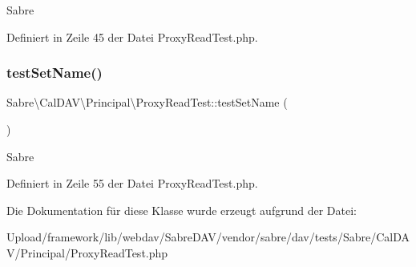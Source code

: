 Sabre 

Definiert in Zeile 45 der Datei Proxy\+Read\+Test.\+php.

\mbox{\label{class_sabre_1_1_cal_d_a_v_1_1_principal_1_1_proxy_read_test_aaf3eb3b9007216ae427118c91dc80aac}} 
\subsubsection{\texorpdfstring{test\+Set\+Name()}{testSetName()}}
{\footnotesize\ttfamily Sabre\textbackslash{}\+Cal\+D\+A\+V\textbackslash{}\+Principal\textbackslash{}\+Proxy\+Read\+Test\+::test\+Set\+Name (\begin{DoxyParamCaption}{ }\end{DoxyParamCaption})}

Sabre 

Definiert in Zeile 55 der Datei Proxy\+Read\+Test.\+php.



Die Dokumentation für diese Klasse wurde erzeugt aufgrund der Datei\+:\begin{DoxyCompactItemize}
\item 
Upload/framework/lib/webdav/\+Sabre\+D\+A\+V/vendor/sabre/dav/tests/\+Sabre/\+Cal\+D\+A\+V/\+Principal/Proxy\+Read\+Test.\+php\end{DoxyCompactItemize}

